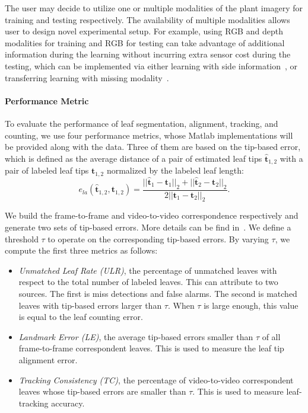 The user may decide to utilize one or multiple modalities of the plant imagery for training and testing respectively.
The availability of multiple modalities allows user to design novel experimental setup.
For example, using RGB and depth modalities for training and RGB for testing can take advantage of additional information during the learning without incurring extra sensor cost during the testing, which can be implemented via either learning with side information~\cite{chen2013boosting}, or transferring learning with missing modality~\cite{ding2014latent,Chen2013b}.


\paragraph{Performance Metric}
To evaluate the performance of leaf segmentation, alignment, tracking, and counting, we use four performance metrics, whose Matlab implementations will be provided along with the data.
Three of them are based on the tip-based error, which is defined as the average distance of a pair of estimated leaf tips $\hat{\bm{t}}_{1,2}$ with a pair of labeled leaf tips $ \bm{t}_{1,2}$ normalized by the labeled leaf length:
\begin {equation}
e_{la}(\hat{\bm{t}}_{1,2}, \bm{t}_{1,2}) = \frac{||\hat{\bm{t}}_1-{\bm{t}}_1||_2 + ||\hat{\bm{t}}_2-{\bm{t}}_2||_2}{2 ||\bm{t}_1-\bm{t}_2||_2}.
\label{eqn:tipError}
\end{equation}

We build the frame-to-frame and video-to-video correspondence respectively and generate two sets of tip-based errors.
More details can be find in~\cite{yin2015}.
We define a threshold $\tau$ to operate on the corresponding tip-based errors.
By varying $\tau$, we compute the first three metrics as follows:
\begin{itemize}
\item {\it{Unmatched Leaf Rate (ULR)}}, the percentage of unmatched leaves with respect to the total number of labeled leaves.
This can attribute to two sources.
The first is miss detections and false alarms.
The second is matched leaves with tip-based errors larger than $\tau$.
When $\tau$ is large enough, this value is equal to the leaf counting error.
\item {\it{Landmark Error (LE)}}, the average tip-based errors smaller than $\tau$ of all frame-to-frame correspondent leaves.
This is used to measure the leaf tip alignment error.
\item {\it{Tracking Consistency (TC)}}, the percentage of video-to-video correspondent leaves whose tip-based errors are smaller than $\tau$.
This is used to measure leaf-tracking accuracy.
\end{itemize}

